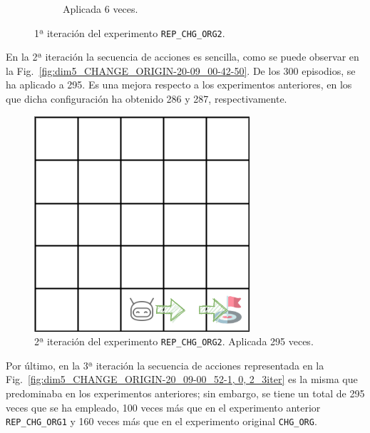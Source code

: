 \begin{figure}
\begin{subfigure}{.3\textwidth}
        \caption{Aplicada 6 veces.}
        \label{fig:dim5_CHANGE_ORIGIN-20_09-00_52-1, 0, 2_6}
    \end{subfigure}
    \caption{1ª iteración del experimento \texttt{REP\_CHG\_ORG2}.}
    \label{fig:dim5_CHANGE_ORIGIN-20_09-00_52-1, 0, 2_1iter}
\end{figure}

En la 2ª iteración la secuencia de acciones es sencilla, como se puede observar en la  Fig.~\ref{fig:dim5_CHANGE_ORIGIN-20-09_00-42-50}. De los 300 episodios, se ha aplicado a 295. Es una mejora respecto a los experimentos anteriores, en los que dicha configuración ha obtenido 286 y 287, respectivamente.\\
 
\begin{figure}
    \centering
    \includegraphics[scale=0.4]{cap5_experimentacion/images/dim5_CHANGE_ORIGIN-20-09_00-42-50.png}
    \caption{2ª iteración del experimento \texttt{REP\_CHG\_ORG2}. Aplicada 295 veces.}
    \label{fig:dim5_CHANGE_ORIGIN-20_09-00_52-1, 0, 2_2iter}
\end{figure}

Por último, en la 3ª iteración la secuencia de acciones representada en  la Fig.~\ref{fig:dim5_CHANGE_ORIGIN-20_09-00_52-1, 0, 2_3iter} es la misma que predominaba en los experimentos anteriores; sin embargo, se tiene un total de 295 veces que se ha empleado,  100 veces más que en el experimento anterior \texttt{REP\_CHG\_ORG1} y 160 veces más que en el experimento original \texttt{CHG\_ORG}. \\

